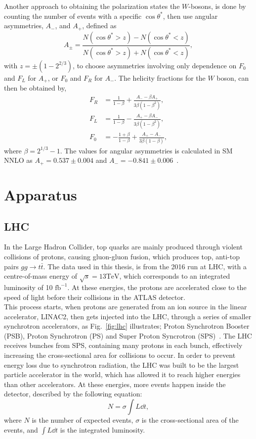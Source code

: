 \documentclass[12pt,a4paper]{article}
\numberwithin{equation}{section}
\begin{document}
Another approach to obtaining the polarization states the $W$-bosons, is done by
counting the number of events with a specific $\cos \theta^*$, then use angular
asymmetries, $A_-$, and $A_+$, defined as
\begin{equation}\label{eq:asymmetries}
  A_{\pm}=\frac{N(\cos \theta^* > z)-N(\cos \theta^* < z)}{N(\cos \theta^* > z)+N(\cos \theta^* < z)},
\end{equation}
with $z=\pm(1-2^{2/3})$, to choose asymmetries involving only dependence on
$F_0$ and $F_L$ for $A_+$, or $F_0$ and $F_R$ for $A_-$. The helicity fractions
for the $W$ boson, can then be obtained by,
\begin{align}
  F_R&=\frac{1}{1-\beta}+\frac{A_- - \beta A_+}{3\beta (1-\beta^2)},\\
  F_L&=\frac{1}{1-\beta}-\frac{A_+ - \beta A_-}{3\beta (1-\beta^2)},\\
  F_0&=-\frac{1+\beta}{1-\beta}+\frac{A_+ - A_-}{3\beta (1-\beta)},
\end{align}
where $\beta = 2^{1/3}-1$. The values for angular asymmetries is calculated in SM
NNLO as $A_+=0.537 \pm 0.004$ and
$A_-=-0.841 \pm 0.006$~\cite[24]{CastroNunesFiolhais:1544047}.

\section{Apparatus}
\subsection{LHC}
In the Large Hadron Collider, top quarks are mainly produced through violent
collisions of protons, causing gluon-gluon fusion, which produces top, anti-top
pairs $gg \rightarrow t\bar t$. The data used in this thesis, is from the 2016 run at LHC,
with a centre-of-mass energy of $\sqrt s = 13 \mathrm{TeV}$, which corresponds
to an integrated luminosity of 10 $\mathrm{fb}^{-1}$\cite{oreach2020}. At these
energies, the protons are accelerated close to the speed of light before their
collisions in the ATLAS detector.\\

This process starts, when protons are generated from an ion source in the linear
accelerator, LINAC2, then gets injected into the LHC, through a series of
smaller synchrotron accelerators, as Fig.~\ref{fig:lhc} illustrates; Proton
Synchrotron Booster (PSB), Proton Synchrotron (PS) and Super Proton Syncrotron
(SPS)~\cite[135]{Evans_2008}. The LHC receives bunches from SPS, containing many
protons in each bunch, effectively increasing the cross-sectional area for
collisions to occur. In order to prevent energy loss due to synchrotron
radiation, the LHC was built to be the largest particle accelerator in the
world, which has allowed it to reach higher energies than other accelerators. At
these energies, more events happen inside the detector, described by the
following equation:
\begin{equation}
  N = \sigma \int L \dd t,
\end{equation}
where $N$ is the number of expected events, $\sigma$ is the cross-sectional area of
the events, and $\int L \dd t$ is the integrated luminosity.
\end{document}
